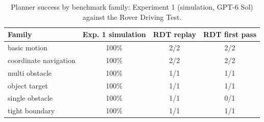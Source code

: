 \begin{table}[htbp]
\centering
\caption{Planner success by benchmark family: Experiment 1 (simulation, GPT-6 Sol) against the Rover Driving Test.}
\label{tab:rdt_family_bridge}
\small
\begin{tabular}{lccc}
\toprule
Family & Exp. 1 simulation & RDT replay & RDT first pass \\
\midrule
basic motion & 100\% & 2/2 & 2/2 \\
coordinate navigation & 100\% & 2/2 & 2/2 \\
multi obstacle & 100\% & 1/1 & 1/1 \\
object target & 100\% & 1/1 & 1/1 \\
single obstacle & 100\% & 1/1 & 0/1 \\
tight boundary & 100\% & 1/1 & 1/1 \\
\bottomrule
\end{tabular}
\end{table}
